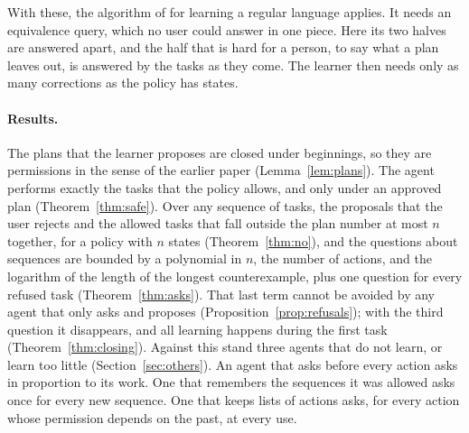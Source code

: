 \documentclass[acmsmall,nonacm,screen]{acmart}
\begin{document}
With these, the algorithm of \citet{angluin1987} for learning a regular language applies. It
needs an equivalence query, which no user could answer in one piece. Here its two halves are
answered apart, and the half that is hard for a person, to say what a plan leaves out, is
answered by the tasks as they come. The learner then needs only as many corrections as the
policy has states.

\paragraph{Results.} The plans that the learner proposes are closed under beginnings, so
they are permissions in the sense of the earlier paper (Lemma~\ref{lem:plans}). The agent
performs exactly the tasks that the policy allows, and only under an approved plan
(Theorem~\ref{thm:safe}). Over any sequence of tasks, the proposals that the user rejects
and the allowed tasks that fall outside the plan number at most $n$ together, for a policy
with $n$ states (Theorem~\ref{thm:no}), and the questions about sequences are bounded by a
polynomial in $n$, the number of actions, and the logarithm of the length of the longest
counterexample, plus one question for every refused task (Theorem~\ref{thm:asks}). That last term
cannot be avoided by any agent that only asks and proposes
(Proposition~\ref{prop:refusals}); with the third question it disappears, and all learning
happens during the first task (Theorem~\ref{thm:closing}). Against this stand three agents
that do not learn, or learn too little (Section~\ref{sec:others}). An agent that asks before
every action asks in proportion to its work. One that remembers the sequences it was allowed
asks once for every new sequence. One that keeps lists of actions asks, for every action
whose permission depends on the past, at every use.
\end{document}
